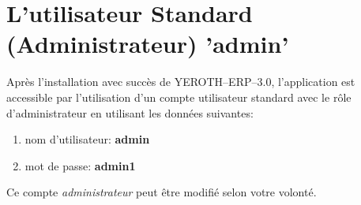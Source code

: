 \documentclass[a4paper, 10pt]{article}
\newcommand{\yerotherptroiszero}{\textcolor{yerenColorBlue}{\sc YEROTH--ERP--$3.0$}\xspace}
\begin{document}
\section{L'utilisateur Standard (Administrateur) 'admin'}

Apr\`es l'installation avec succ\`es de \yerotherptroiszero,
l'application est accessible par l'utilisation
d'un compte utilisateur standard avec le r\^ole
d'administrateur en utilisant les donn\'ees suivantes:
\begin{enumerate}[1)]
	\item nom d'utilisateur: \textbf{admin}
	\item mot de passe: \textbf{admin1}\\
\end{enumerate}

Ce compte \emph{administrateur} peut \^etre modifi\'e
selon votre volont\'e.
\end{document}
